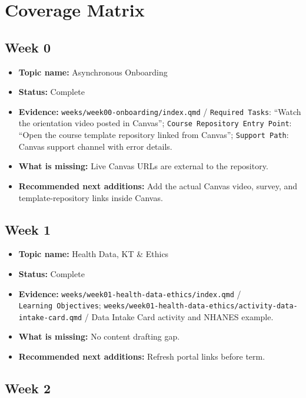 \documentclass[
  letterpaper,
  DIV=11,
  numbers=noendperiod,
  oneside]{scrreprt}
\providecommand{\tightlist}{%
  \setlength{\itemsep}{0pt}\setlength{\parskip}{0pt}}
\begin{document}
\section{Coverage Matrix}\label{coverage-matrix}

\subsection{Week 0}\label{week-0}

\begin{itemize}
\tightlist
\item
  \textbf{Topic name:} Asynchronous Onboarding
\item
  \textbf{Status:} Complete
\item
  \textbf{Evidence:} \texttt{weeks/week00-onboarding/index.qmd} /
  \texttt{Required\ Tasks}: ``Watch the orientation video posted in
  Canvas''; \texttt{Course\ Repository\ Entry\ Point}: ``Open the course
  template repository linked from Canvas''; \texttt{Support\ Path}:
  Canvas support channel with error details.
\item
  \textbf{What is missing:} Live Canvas URLs are external to the
  repository.
\item
  \textbf{Recommended next additions:} Add the actual Canvas video,
  survey, and template-repository links inside Canvas.
\end{itemize}

\subsection{Week 1}\label{week-1}

\begin{itemize}
\tightlist
\item
  \textbf{Topic name:} Health Data, KT \& Ethics
\item
  \textbf{Status:} Complete
\item
  \textbf{Evidence:} \texttt{weeks/week01-health-data-ethics/index.qmd}
  / \texttt{Learning\ Objectives};
  \texttt{weeks/week01-health-data-ethics/activity-data-intake-card.qmd}
  / Data Intake Card activity and NHANES example.
\item
  \textbf{What is missing:} No content drafting gap.
\item
  \textbf{Recommended next additions:} Refresh portal links before term.
\end{itemize}

\subsection{Week 2}\label{week-2}
\end{document}
